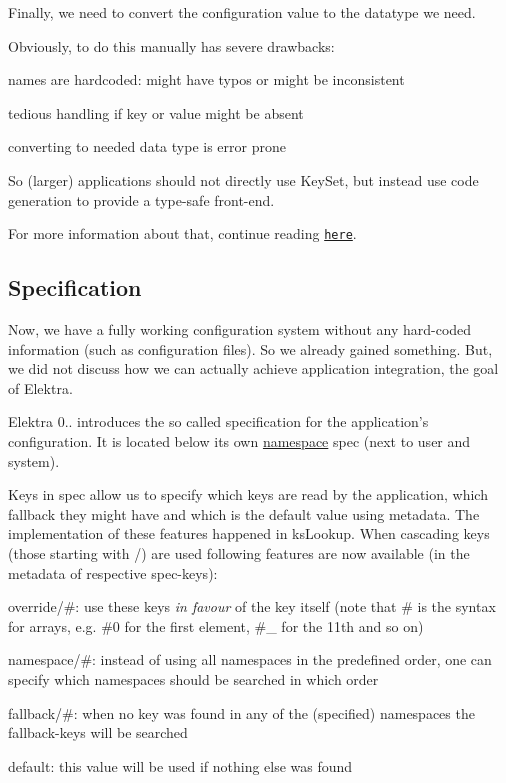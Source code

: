 Finally, we need to convert the configuration value to the datatype we need.

Obviously, to do this manually has severe drawbacks\+:


\begin{DoxyItemize}
\item names are hardcoded\+: might have typos or might be inconsistent
\item tedious handling if key or value might be absent
\item converting to needed data type is error prone
\end{DoxyItemize}

So (larger) applications should not directly use {\ttfamily Key\+Set}, but instead use code generation to provide a type-\/safe front-\/end.

For more information about that, continue reading \href{https://github.com/ElektraInitiative/libelektra/tree/master/src/tools/gen}{\tt here}.

\subsection*{Specification}

Now, we have a fully working configuration system without any hard-\/coded information (such as configuration files). So we already gained something. But, we did not discuss how we can actually achieve application integration, the goal of Elektra.

Elektra 0.. introduces the so called specification for the application's configuration. It is located below its own \hyperlink{md_doc_help_elektra-namespaces_doc_help_elektra-namespaces_md}{namespace} {\ttfamily spec} (next to user and system).

Keys in {\ttfamily spec} allow us to specify which keys are read by the application, which fallback they might have and which is the default value using metadata. The implementation of these features happened in {\ttfamily ks\+Lookup}. When cascading keys (those starting with {\ttfamily /}) are used following features are now available (in the metadata of respective {\ttfamily spec}-\/keys)\+:


\begin{DoxyItemize}
\item {\ttfamily override/\#}\+: use these keys {\itshape in favour} of the key itself (note that {\ttfamily \#} is the syntax for arrays, e.\+g. {\ttfamily \#0} for the first element, {\ttfamily \#\+\_} for the 11th and so on)
\item {\ttfamily namespace/\#}\+: instead of using all namespaces in the predefined order, one can specify which namespaces should be searched in which order
\item {\ttfamily fallback/\#}\+: when no key was found in any of the (specified) namespaces the {\ttfamily fallback}-\/keys will be searched
\item {\ttfamily default}\+: this value will be used if nothing else was found
\end{DoxyItemize}

